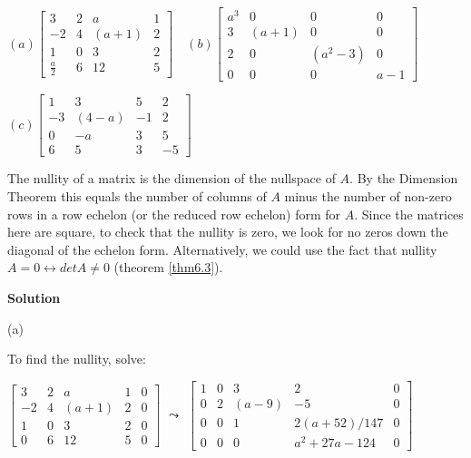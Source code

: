 \begin{enumerate}
$(a)\left [ \begin{array}{rrcr} 3&2&a&1\\ -2&4&(a+1)&2\\ 1&0&3&2\\
\frac{a}{2}&6&12&5 \end{array} \right ]\quad (b)\left  [
\begin{array}{cccc} a^3&0&0&0\\ 3&(a+1)&0&0\\ 2&0&(a^2-3)&0\\
0&0&0&a-1 \end{array} \right ] \quad $

$(c)\left [ \begin{array}{rcrr} 1&3&5&2\\ -3&(4-a)&-1&2\\
0&-a&3&5\\ 6&5&3&-5\end{array} \right ]$

The nullity of a matrix is the dimension of the nullspace of $A$.  By the Dimension Theorem
this equals the number of columns of $A$ minus the number of non-zero rows in a row echelon (or the reduced row echelon) form for $A$.  Since the matrices here are square, to check that the nullity is zero, we look for no zeros down the diagonal of the echelon form.  Alternatively, we could use the fact that nullity $A=0 \leftrightarrow detA\neq0$ (theorem \ref{thm6.3}).

\noindent \textbf{Solution} \begin{description} \item (a)

\noindent To find the nullity, solve:

$\left [ \begin{array}{rrrr|r}
                          3&2&a&1&0\\
                          -2&4&(a+1)&2&0\\
                          1&0&3&2&0\\
                          0&6&12&5&0\end{array} \right ]$
                           \quad $\leadsto$\quad
$\left [ \begin{array}{rrrr|r}
                          1&0&3&2&0\\
                          0&2&(a-9)&-5&0\\
                          0&0&1&2(a+52)/147&0\\
                          0&0&0&a^2+27a-124&0\end{array} \right ]$


\end{description}
\end{enumerate}
